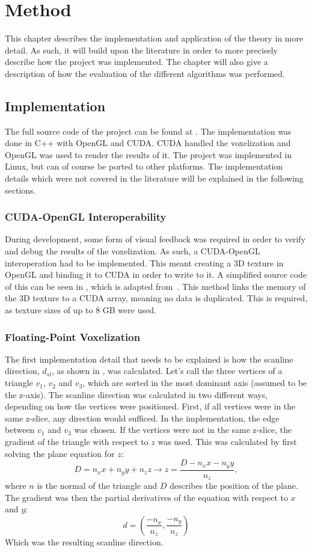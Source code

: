 \chapter{Method}\label{cha:method}
This chapter describes the implementation and application of the theory in more detail.
As such, it will build upon the literature in order to more precisely describe how the project was implemented.
The chapter will also give a description of how the evaluation of the different algorithms was performed.

\section{Implementation}
The full source code of the project can be found at \cite{source-code}.
The implementation was done in C++ with OpenGL and CUDA.
CUDA handled the voxelization and OpenGL was used to render the results of it.
The project was implemented in Linux, but can of course be ported to other platforms.
The implementation details which were not covered in the literature will be explained in the following sections.

\subsection{CUDA-OpenGL Interoperability}
During development, some form of visual feedback was required in order to verify and debug the results of the voxelization.
As such, a CUDA-OpenGL interoperation had to be implemented.
This meant creating a 3D texture in OpenGL and binding it to CUDA in order to write to it.
A simplified source code of this can be seen in , which is adapted from~\cite{cuda-opengl-Interoperability}.
This method links the memory of the 3D texture to a CUDA array, meaning no data is duplicated.
This is required, as texture sizes of up to 8 GB were used.

\vfill

\subsection{Floating-Point Voxelization}
The first implementation detail that needs to be explained is how the scanline direction, $d_{sl}$, as shown in , was calculated.
Let's call the three vertices of a triangle $v_1$, $v_2$ and $v_3$, which are sorted in the most dominant axis (assumed to be the z-axis).
The scanline direction was calculated in two different ways, depending on how the vertices were positioned.
First, if all vertices were in the same z-slice, any direction would sufficed.
In the implementation, the edge between $v_1$ and $v_3$ was chosen.
If the vertices were not in the same z-slice, the gradient of the triangle with respect to $z$ was used.
This was calculated by first solving the plane equation for $z$:
$$ D = n_x x + n_y y + n_z z \rightarrow z = \frac{D - n_x x - n_y y}{n_z},$$
where $n$ is the normal of the triangle and $D$ describes the position of the plane.
The gradient was then the partial derivatives of the equation with respect to $x$ and $y$:
$$d = (\frac{-n_x}{n_z}, \frac{-n_y}{n_z})$$
Which was the resulting scanline direction.

